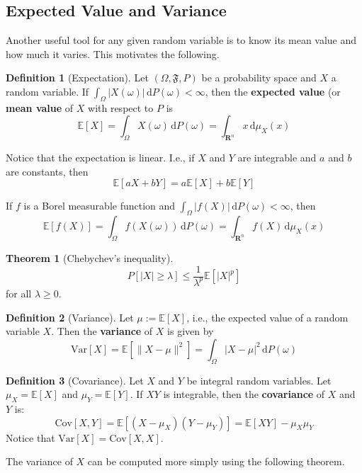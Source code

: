 \documentclass[12pt,a4paper]{article}
\theoremstyle{definition}
\newtheorem{theorem}{Theorem}[section]
\newtheorem{definition}{Definition}[section]
\begin{document}
\subsection{Expected Value and Variance}

Another useful tool for any given random variable is to know its mean value and how much it varies. This motivates the following.

\begin{definition}[Expectation]
	Let $(\Omega, \mathfrak{F}, P)$ be a probability space and $X$ a random variable. If $\int_{\Omega} |X(\omega)|\, \mathrm{d}P(\omega) < \infty$, then the \textbf{expected value} (or \textbf{mean value} of $X$ with respect to $P$ is
	\[
		\mathbb{E}[X] = \int_{\Omega} X(\omega) \, \mathrm{d}P(\omega) = \int_{\textbf{R}^n} x \, \mathrm{d}\mu_X(x)
	\]
\end{definition}

Notice that the expectation is linear. I.e., if $X$ and $Y$ are integrable and $a$ and $b$ are constants, then \[ \mathbb{E} [aX+bY] = a \mathbb{E}[X] + b \mathbb{E}[Y] \]

If $f$ is a Borel measurable function and $\int_{\Omega} |f(X)| \, \mathrm{d} P(\omega) < \infty$, then
\[
	\mathbb{E}[f(X)] = \int_{\Omega} f(X(\omega)) \, \mathrm{d} P(\omega) = \int_{\textbf{R}^n} f(X) \, \mathrm{d}\mu_X(x)
\]

\begin{theorem}[Chebychev's inequality]
	\[
		P[ |X| \geq \lambda] \leq \frac{1}{\lambda^p} \mathbb{E}[|X|^p]
	\]
	for all $\lambda \geq 0$.
\end{theorem}

\begin{definition}[Variance]
	Let $\mu := \mathbb{E}[X]$, i.e., the expected value of a random variable $X$. Then the \textbf{variance} of $X$ is given by
	\[
		\text{Var}[X] = \mathbb{E}[\|X - \mu\|^2] = \int_{\Omega} |X - \mu|^2 \, \mathrm{d} P(\omega)
	\]
\end{definition}

\begin{definition}[Covariance]
	Let $X$ and $Y$ be integral random variables. Let $\mu_X = \mathbb{E}[X]$ and $\mu_Y = \mathbb{E}[Y]$. If $XY$ is integrable, then the \textbf{covariance} of $X$ and $Y$ is:
	\[
		\text{Cov}[X,Y] = \mathbb{E}[(X-\mu_X)(Y-\mu_Y)] = \mathbb{E}[XY]-\mu_X \mu_Y
	\]
	Notice that $\text{Var}[X] = \text{Cov}[X,X]$.
\end{definition}

The variance of $X$ can be computed more simply using the following theorem.
\end{document}
